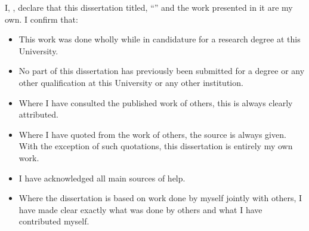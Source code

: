 \documentclass[
11pt, %
english, %
onehalfspacing, %
toctotoc, %
headsepline, %
twoside,
]{MastersDoctoralThesis} %
\begin{document}
\begin{declaration}
\addchaptertocentry{\authorshipname} %

\noindent I, \authorname, declare that this dissertation titled, \enquote{\ttitle} and the work presented in it are my own. I confirm that:


\begin{itemize} 
\item This work was done wholly while in candidature for a research degree at this University.
\item No part of this dissertation has previously been submitted for a degree or any other qualification at this University or any other institution.
\item Where I have consulted the published work of others, this is always clearly attributed.
\item Where I have quoted from the work of others, the source is always given. With the exception of such quotations, this dissertation is entirely my own work.
\item I have acknowledged all main sources of help.
\item Where the dissertation is based on work done by myself jointly with others, I have made clear exactly what was done by others and what I have contributed myself.\\
\end{itemize}
 
 
\end{declaration}


\end{document}
